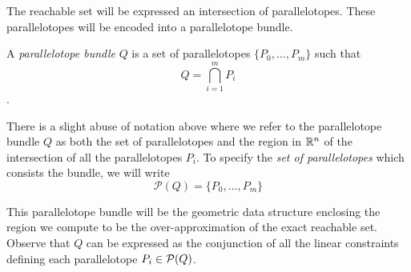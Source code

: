 %
The reachable set will be expressed an intersection of parallelotopes. These parallelotopes will be encoded into a parallelotope bundle.
%
\begin{definition}
A \emph{parallelotope bundle} $Q$ is a set of parallelotopes $\{P_0, \ldots, P_m\}$ such that
  $$ Q = \bigcap_{i=1}^{m}P_i $$.
\end{definition}

\begin{remark}
There is a slight abuse of notation above where we refer to the parallelotope bundle $Q$ as both the set of parallelotopes and the region in ${\mathbb{R}}^n$ of the intersection of all the parallelotopes $P_i$. To specify the \emph{set of parallelotopes} which consists the bundle, we will write
$$
\mathcal{P}(Q) = \{P_0, \ldots, P_m\}
$$
\end{remark}

%
\noindent This parallelotope bundle will be the geometric data structure enclosing the region we compute to be the over-approximation of the exact reachable set. Observe that $Q$ can be expressed as the conjunction of all the linear constraints defining each parallelotope $P_i \in \mathcal{P}(Q)$.

